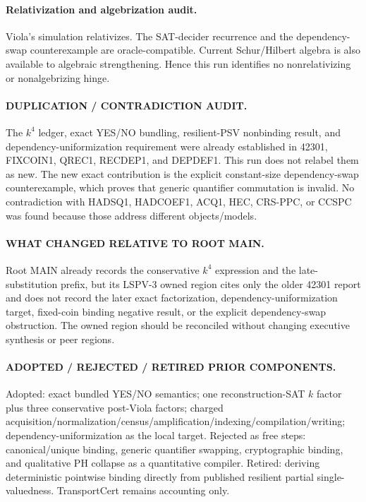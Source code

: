 \documentclass[11pt]{article}
\begin{document}
\paragraph{Relativization and algebrization audit.}
Viola's simulation relativizes. The SAT-decider recurrence and the dependency-swap counterexample are oracle-compatible. Current Schur/Hilbert algebra is also available to algebraic strengthening. Hence this run identifies no nonrelativizing or nonalgebrizing hinge.

\paragraph{DUPLICATION / CONTRADICTION AUDIT.}
The $k^4$ ledger, exact YES/NO bundling, resilient-PSV nonbinding result, and dependency-uniformization requirement were already established in 42301, FIXCOIN1, QREC1, RECDEP1, and DEPDEF1. This run does not relabel them as new. The new exact contribution is the explicit constant-size dependency-swap counterexample, which proves that generic quantifier commutation is invalid. No contradiction with HADSQ1, HADCOEF1, ACQ1, HEC, CRS-PPC, or CCSPC was found because those address different objects/models.

\paragraph{WHAT CHANGED RELATIVE TO ROOT MAIN.}
Root MAIN already records the conservative $k^4$ expression and the late-substitution prefix, but its LSPV-3 owned region cites only the older 42301 report and does not record the later exact factorization, dependency-uniformization target, fixed-coin binding negative result, or the explicit dependency-swap obstruction. The owned region should be reconciled without changing executive synthesis or peer regions.

\paragraph{ADOPTED / REJECTED / RETIRED PRIOR COMPONENTS.}
Adopted: exact bundled YES/NO semantics; one reconstruction-SAT $k$ factor plus three conservative post-Viola factors; charged acquisition/normalization/census/amplification/indexing/compilation/writing; dependency-uniformization as the local target. Rejected as free steps: canonical/unique binding, generic quantifier swapping, cryptographic binding, and qualitative PH collapse as a quantitative compiler. Retired: deriving deterministic pointwise binding directly from published resilient partial single-valuedness. TransportCert remains accounting only.
\end{document}
